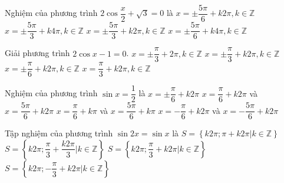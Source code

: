 \begin{ex}%
	Nghiệm của phương trình $ 2\cos \dfrac{x}{2}+\sqrt{3}=0$ là 
	 \choice
		{$  x=\pm\dfrac{5\pi}{6}+k2\pi ,k\in\mathbb{Z} $}
		{\True  $ x=\pm\dfrac{5\pi}{3}+k4\pi ,k\in\mathbb{Z}$}
		 {$x=\pm\dfrac{5\pi}{3}+k2\pi ,k\in\mathbb{Z} $}
		{$x=\pm\dfrac{5\pi}{6}+k4\pi ,k\in\mathbb{Z} $} 
\end{ex}

\begin{ex}%
	Giải  phương trình $ 2\cos x-1=0 $.
	\choice 
		{$x=\pm  \dfrac{\pi}{3}+2\pi, k\in \mathbb{Z} $}
		{\True $x=\pm \dfrac{\pi}{3}+k2\pi, k\in \mathbb{Z} $} 
		{$x=\pm  \dfrac{\pi}{6}+k2\pi, k\in \mathbb{Z} $}
		{$x=  \dfrac{\pi}{3}+k2\pi, k\in \mathbb{Z} $}
\end{ex}

\begin{ex}%
	 Nghiệm của phương trình $\sin x=\dfrac{1}{2}$ là
	 \choice
		{$x=\pm \dfrac{\pi}{6}+k2\pi$} 
		{\True $x=\dfrac{\pi}{6}+k2\pi$  và $x=\dfrac{5\pi}{6}+k2\pi$}
		{$x=\dfrac{\pi}{6}+k\pi$ và $x=\dfrac{5\pi}{6}+k\pi$} 
		{$x=-\dfrac{\pi}{6}+k2\pi$ và $x=-\dfrac{5\pi}{6}+k2\pi$} 
\end{ex}

\begin{ex}%
	Tập nghiệm  của phương trình $\sin 2x=\sin x$ là
	 \choice
		{$S=\left\{k2\pi;\pi+k2\pi\left|k\in  \mathbb{Z}\right. \right\}$}
		{\True $S=\left\{k2\pi;\dfrac{\pi}{3}+\dfrac{k2\pi}{3}\left|k\in \mathbb{Z}\right. \right\}$} 
		{$S=\left\{k2\pi;\dfrac{\pi}{3}+k2\pi\left|k\in \mathbb{Z}\right. \right\}$} 
		{$S=\left\{k2\pi;-\dfrac{\pi}{3}+k2\pi\left|k\in \mathbb{Z}\right.  \right\}$}
	 \loigiai{
		Ta có $\sin 2x=\sin  x \Leftrightarrow \left[
		\begin{aligned}
			 &2x=x+k2\pi \\
			&2x=\pi-x+k2\pi 
		\end{aligned}\right. \Leftrightarrow \left[
		\begin{aligned}
			&x=k2\pi \\ 
			 &x=\dfrac{\pi}{3}+\dfrac{k2\pi}{3}
	\end{aligned}\right. \left(k\in \mathbb{Z}\right)$.}
\end{ex}

